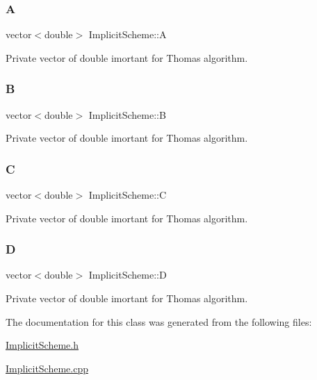 \subsubsection{\texorpdfstring{A}{A}}
{\footnotesize\ttfamily vector$<$double$>$ Implicit\+Scheme\+::A\hspace{0.3cm}{\ttfamily [private]}}

Private vector of double imortant for Thomas algorithm. \mbox{\label{class_implicit_scheme_affeedb3fe9f7ebb8be113c884dd09a97}} 
\subsubsection{\texorpdfstring{B}{B}}
{\footnotesize\ttfamily vector$<$double$>$ Implicit\+Scheme\+::B\hspace{0.3cm}{\ttfamily [private]}}

Private vector of double imortant for Thomas algorithm. \mbox{\label{class_implicit_scheme_ab9059b52250e0afdd41b855299e6cf71}} 
\subsubsection{\texorpdfstring{C}{C}}
{\footnotesize\ttfamily vector$<$double$>$ Implicit\+Scheme\+::C\hspace{0.3cm}{\ttfamily [private]}}

Private vector of double imortant for Thomas algorithm. \mbox{\label{class_implicit_scheme_a30dad74ec599966b5ba7965f382d28cb}} 
\subsubsection{\texorpdfstring{D}{D}}
{\footnotesize\ttfamily vector$<$double$>$ Implicit\+Scheme\+::D\hspace{0.3cm}{\ttfamily [private]}}

Private vector of double imortant for Thomas algorithm. 

The documentation for this class was generated from the following files\+:\begin{DoxyCompactItemize}
\item 
\mbox{\hyperlink{_implicit_scheme_8h}{Implicit\+Scheme.\+h}}\item 
\mbox{\hyperlink{_implicit_scheme_8cpp}{Implicit\+Scheme.\+cpp}}\end{DoxyCompactItemize}
